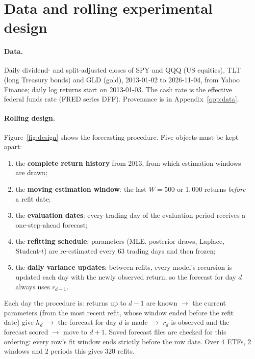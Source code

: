 \documentclass[11pt]{article}
\begin{document}
\section{Data and rolling experimental design}\label{sec:design}
\paragraph{Data.} Daily dividend- and split-adjusted closes of SPY and QQQ (US equities), TLT (long Treasury bonds) and
GLD (gold), 2013-01-02 to 2026-11-04, from Yahoo Finance; daily log returns start on 2013-01-03. The cash rate is
the effective federal funds rate (FRED series DFF). Provenance is in Appendix~\ref{app:data}.

\paragraph{Rolling design.} Figure~\ref{fig:design} shows the forecasting procedure. Five objects must be kept apart:
\begin{enumerate}
\item the \textbf{complete return history} from 2013, from which estimation windows are drawn;
\item the \textbf{moving estimation window}: the last $W=500$ or $1{,}000$ returns \emph{before} a refit date;
\item the \textbf{evaluation dates}: every trading day of the evaluation period receives a one-step-ahead forecast;
\item the \textbf{refitting schedule}: parameters (MLE, posterior draws, Laplace, Student-$t$) are re-estimated every
63 trading days and then frozen;
\item the \textbf{daily variance updates}: between refits, every model's recursion is updated each day with the newly
observed return, so the forecast for day $d$ always uses $r_{d-1}$.
\end{enumerate}
\noindent Each day the procedure is: returns up to $d-1$ are known $\rightarrow$ the current parameters (from the most
recent refit, whose window ended before the refit date) give $h_d$ $\rightarrow$ the forecast for day $d$ is made
$\rightarrow$ $r_d$ is observed and the forecast scored $\rightarrow$ move to $d+1$. Saved forecast files are checked
for this ordering: every row's fit window ends strictly before the row date. Over 4 ETFs, 2 windows and 2 periods
this gives 320 refits.
\end{document}
